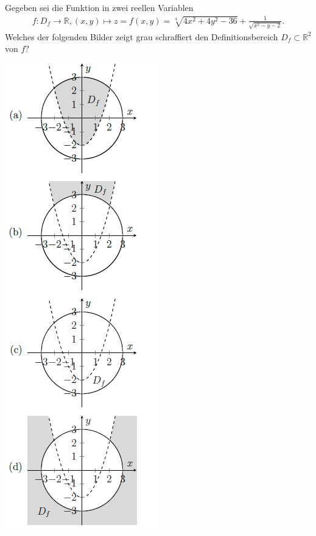 \subsection*{}
Gegeben sei die Funktion in zwei reellen Variablen
\begin{align*}
f : D_f \to \mathbb{R}, (x,y) \mapsto
z = f(x,y) = \sqrt[4]{4x^2 + 4 y^2 - 36}
+ \frac{1}{\sqrt{x^2 - y -2}}.
\end{align*}
Welches der folgenden Bilder zeigt grau schraffiert den Definitionsbereich $ D_f \subset \mathbb{R}^2 $ von $ f $?
\renewcommand{\labelenumi}{(\alph{enumi})}
\begin{center}
	\includegraphics{pictures/auf3_4}
\end{center}

